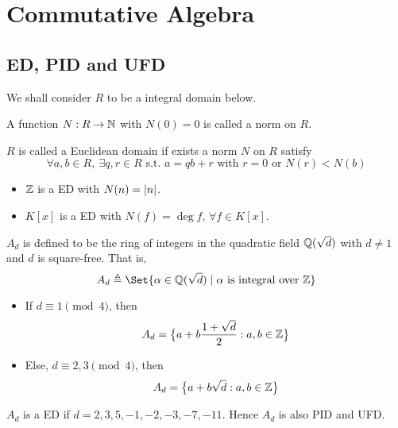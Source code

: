 \section{Commutative Algebra}

\subsection{ED, PID and UFD}

We shall consider $R$ to be a integral domain below.
\begin{definition}
  A function $N: R \to \mathbb{N}$ with $N(0) = 0$ is called a norm on $R$.
\end{definition}

\begin{definition}
  $R$ is called a Euclidean domain if exists a norm $N$ on $R$
  satisfy
  \[ \forall a, b \in R, \ \exists q, r \in R \text{ s.t. } a = qb + r \text{ with } r = 0 \text{ or } N(r) < N(b) \]
\end{definition}

\begin{example} \hfill
  \begin{itemize}
    \item $\mathbb{Z}$ is a ED with $N(n) = \lvert n\rvert$.
    \item $K[x]$ is a ED with $N(f) = \deg f, \, \forall f \in K[x]$.
  \end{itemize}
\end{example}

\begin{definition}
  $A_d$ is defined to be the ring of integers in the quadratic field $\mathbb{Q}(\sqrt{d})$
  with $d \neq 1$ and $d$ is square-free. That is,
  \[ A_d \triangleq \Set{ \alpha \in \Qb(\sqrt{d}) \mid \alpha \text{ is integral over } \Zb} \]
\end{definition}

\begin{theorem} \hfill
  \begin{itemize}
    \item If $d \equiv 1 \pmod{4}$, then
      \[ A_d = \big\{ a + b \frac{1 + \sqrt{d}}{2} : a, b \in \mathbb{Z} \big\} \]
    \item Else, $d \equiv 2, 3 \pmod{4}$, then
      \[ A_d = \big\{ a + b \sqrt{d} : a, b \in \mathbb{Z} \big\} \]
  \end{itemize}
\end{theorem}

\begin{theorem}
  $A_d$ is a ED if $d = 2, 3, 5, -1, -2, -3, -7, -11$. Hence $A_d$ is also PID and UFD.
\end{theorem}

